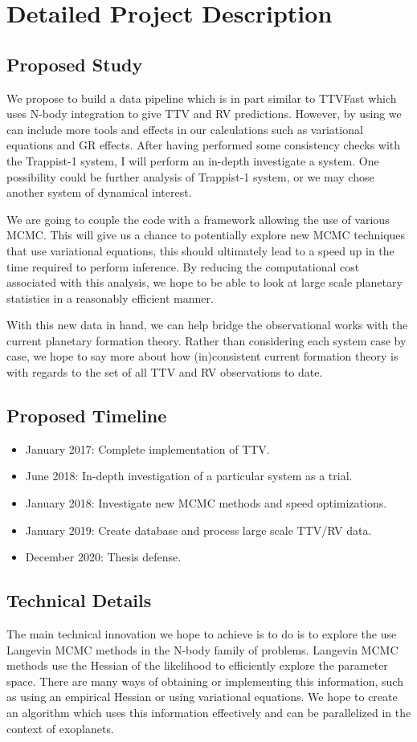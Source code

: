 \section{Detailed Project Description}
\subsection{Proposed Study}
We propose to build a data pipeline which is in part similar to TTVFast which uses N-body integration to give TTV and RV predictions. 
However, by using \reb we can include more tools and effects in our calculations such as variational equations and GR effects.
After having performed some consistency checks with the Trappist-1 system, I will perform an in-depth investigate a system.
One possibility could be further analysis of Trappist-1 system, or we may chose another system of dynamical interest.


We are going to couple the \reb code with a framework allowing the use of various MCMC.
This will give us a chance to potentially explore new MCMC techniques that use variational equations, this should ultimately lead to a speed up in the time required to perform inference.
By reducing the computational cost associated with this analysis, we hope to be able to look at large scale planetary statistics in a reasonably efficient manner.


With this new data in hand, we can help bridge the observational works with the current planetary formation theory.
Rather than considering each system case by case, we hope to say more about how (in)consistent current formation theory is with regards to the set of all TTV and RV observations to date.
\subsection{Proposed Timeline}
\begin{itemize}
	\item January 2017: Complete implementation of TTV.
	\item June 2018: In-depth investigation of a particular system as a trial.
	\item January 2018: Investigate new MCMC methods and speed optimizations.
	\item January 2019: Create database and process large scale TTV/RV data.
	\item December 2020: Thesis defense.
\end{itemize}

\subsection{Technical Details}
The main technical innovation we hope to achieve is to do is to explore the use Langevin MCMC methods in the N-body family of problems. 
Langevin MCMC methods use the Hessian of the likelihood to efficiently explore the parameter space. 
There are many ways of obtaining or implementing this information, such as using an empirical Hessian or using variational equations. 
We hope to create an algorithm which uses this information effectively and can be parallelized in the context of exoplanets.


